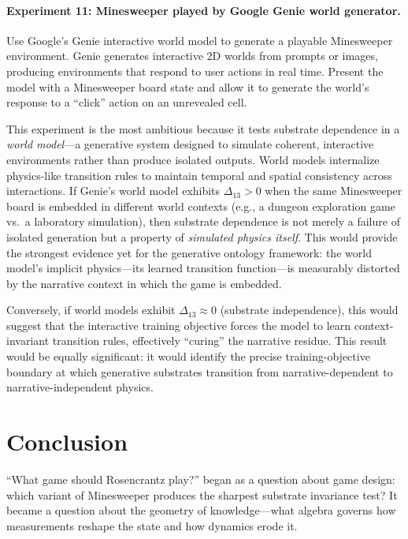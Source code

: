\documentclass[12pt,a4paper]{article}
\theoremstyle{definition}
\theoremstyle{remark}
\begin{document}
\paragraph{Experiment 11: Minesweeper played by Google Genie world generator.}
Use Google's Genie interactive world model to generate a playable Minesweeper environment.  Genie generates interactive 2D worlds from prompts or images, producing environments that respond to user actions in real time.  Present the model with a Minesweeper board state and allow it to generate the world's response to a ``click'' action on an unrevealed cell.

This experiment is the most ambitious because it tests substrate dependence in a \emph{world model}---a generative system designed to simulate coherent, interactive environments rather than produce isolated outputs.  World models internalize physics-like transition rules to maintain temporal and spatial consistency across interactions.  If Genie's world model exhibits $\Delta_{13} > 0$ when the same Minesweeper board is embedded in different world contexts (e.g., a dungeon exploration game vs.\ a laboratory simulation), then substrate dependence is not merely a failure of isolated generation but a property of \emph{simulated physics itself}.  This would provide the strongest evidence yet for the generative ontology framework: the world model's implicit physics---its learned transition function---is measurably distorted by the narrative context in which the game is embedded.

Conversely, if world models exhibit $\Delta_{13} \approx 0$ (substrate independence), this would suggest that the interactive training objective forces the model to learn context-invariant transition rules, effectively ``curing'' the narrative residue.  This result would be equally significant: it would identify the precise training-objective boundary at which generative substrates transition from narrative-dependent to narrative-independent physics.


\section{Conclusion}
\label{sec:conclusion}

``What game should Rosencrantz play?'' began as a question about game design: which variant of Minesweeper produces the sharpest substrate invariance test?  It became a question about the geometry of knowledge---what algebra governs how measurements reshape the state and how dynamics erode it.
\end{document}
